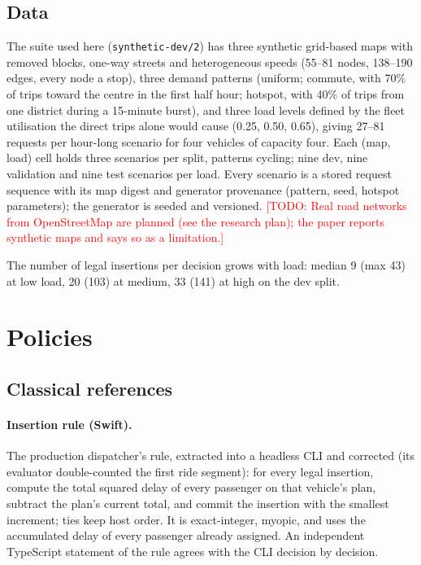 \documentclass[11pt]{article}
\newcommand{\todo}[1]{\textcolor{red}{[TODO: #1]}}
\begin{document}
\subsection{Data}
The suite used here (\texttt{synthetic-dev/2}) has three synthetic grid-based maps with removed blocks, one-way streets and heterogeneous speeds (55--81 nodes, 138--190 edges, every node a stop), three demand patterns (uniform; commute, with 70\% of trips toward the centre in the first half hour; hotspot, with 40\% of trips from one district during a 15-minute burst), and three load levels defined by the fleet utilisation the direct trips alone would cause (0.25, 0.50, 0.65), giving 27--81 requests per hour-long scenario for four vehicles of capacity four. Each (map, load) cell holds three scenarios per split, patterns cycling; nine dev, nine validation and nine test scenarios per load. Every scenario is a stored request sequence with its map digest and generator provenance (pattern, seed, hotspot parameters); the generator is seeded and versioned. \todo{Real road networks from OpenStreetMap are planned (see the research plan); the paper reports synthetic maps and says so as a limitation.}

The number of legal insertions per decision grows with load: median 9 (max 43) at low load, 20 (103) at medium, 33 (141) at high on the dev split.

\section{Policies}
\label{sec:baselines}

\subsection{Classical references}
\paragraph{Insertion rule (Swift).} The production dispatcher's rule, extracted into a headless CLI and corrected (its evaluator double-counted the first ride segment): for every legal insertion, compute the total squared delay of every passenger on that vehicle's plan, subtract the plan's current total, and commit the insertion with the smallest increment; ties keep host order. It is exact-integer, myopic, and uses the accumulated delay of every passenger already assigned. An independent TypeScript statement of the rule agrees with the CLI decision by decision.
\end{document}
